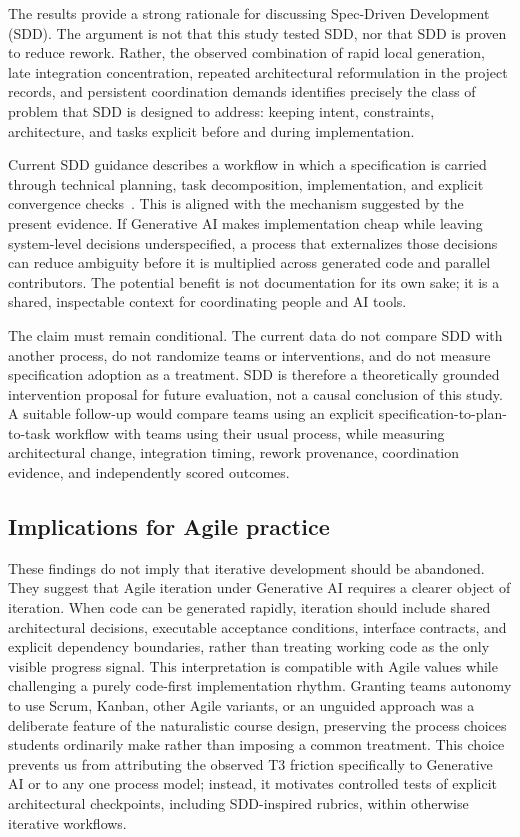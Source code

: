 The results provide a strong rationale for discussing Spec-Driven Development
(SDD). The argument is not that this study tested SDD, nor that SDD is proven
to reduce rework. Rather, the observed combination of rapid local generation,
late integration concentration, repeated architectural reformulation in the
project records, and persistent coordination demands identifies precisely the
class of problem that SDD is designed to address: keeping intent, constraints,
architecture, and tasks explicit before and during implementation.

Current SDD guidance describes a workflow in which a specification is carried
through technical planning, task decomposition, implementation, and explicit
convergence checks~\cite{github2025spec,thoughtworks202Xspec}. This is aligned
with the mechanism suggested by the present evidence. If Generative AI makes
implementation cheap while leaving system-level decisions underspecified, a
process that externalizes those decisions can reduce ambiguity before it is
multiplied across generated code and parallel contributors. The potential
benefit is not documentation for its own sake; it is a shared, inspectable
context for coordinating people and AI tools.

The claim must remain conditional. The current data do not compare SDD with
another process, do not randomize teams or interventions, and do not measure
specification adoption as a treatment. SDD is therefore a theoretically
grounded intervention proposal for future evaluation, not a causal conclusion
of this study. A suitable follow-up would compare teams using an explicit
specification-to-plan-to-task workflow with teams using their usual process,
while measuring architectural change, integration timing, rework provenance,
coordination evidence, and independently scored outcomes.

\subsection{Implications for Agile practice}

These findings do not imply that iterative development should be abandoned.
They suggest that Agile iteration under Generative AI requires a clearer object
of iteration. When code can be generated rapidly, iteration should include
shared architectural decisions, executable acceptance conditions, interface
contracts, and explicit dependency boundaries, rather than treating working
code as the only visible progress signal. This interpretation is compatible
with Agile values while challenging a purely code-first implementation rhythm.
Granting teams autonomy to use Scrum, Kanban, other Agile variants, or an
unguided approach was a deliberate feature of the naturalistic course design,
preserving the process choices students ordinarily make rather than imposing a
common treatment. This choice prevents us from attributing the observed T3
friction specifically to Generative AI or to any one process model; instead, it
motivates controlled tests of explicit architectural checkpoints, including
SDD-inspired rubrics, within otherwise iterative workflows.

